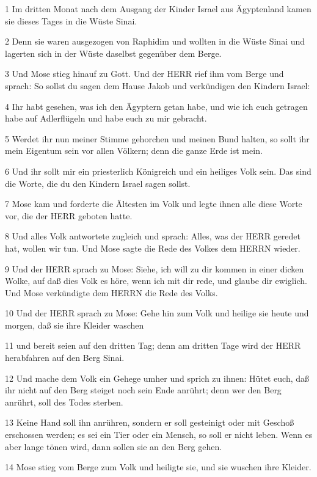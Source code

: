 \par 1 Im dritten Monat nach dem Ausgang der Kinder Israel aus Ägyptenland kamen sie dieses Tages in die Wüste Sinai.
\par 2 Denn sie waren ausgezogen von Raphidim und wollten in die Wüste Sinai und lagerten sich in der Wüste daselbst gegenüber dem Berge.
\par 3 Und Mose stieg hinauf zu Gott. Und der HERR rief ihm vom Berge und sprach: So sollst du sagen dem Hause Jakob und verkündigen den Kindern Israel:
\par 4 Ihr habt gesehen, was ich den Ägyptern getan habe, und wie ich euch getragen habe auf Adlerflügeln und habe euch zu mir gebracht.
\par 5 Werdet ihr nun meiner Stimme gehorchen und meinen Bund halten, so sollt ihr mein Eigentum sein vor allen Völkern; denn die ganze Erde ist mein.
\par 6 Und ihr sollt mir ein priesterlich Königreich und ein heiliges Volk sein. Das sind die Worte, die du den Kindern Israel sagen sollst.
\par 7 Mose kam und forderte die Ältesten im Volk und legte ihnen alle diese Worte vor, die der HERR geboten hatte.
\par 8 Und alles Volk antwortete zugleich und sprach: Alles, was der HERR geredet hat, wollen wir tun. Und Mose sagte die Rede des Volkes dem HERRN wieder.
\par 9 Und der HERR sprach zu Mose: Siehe, ich will zu dir kommen in einer dicken Wolke, auf daß dies Volk es höre, wenn ich mit dir rede, und glaube dir ewiglich. Und Mose verkündigte dem HERRN die Rede des Volks.
\par 10 Und der HERR sprach zu Mose: Gehe hin zum Volk und heilige sie heute und morgen, daß sie ihre Kleider waschen
\par 11 und bereit seien auf den dritten Tag; denn am dritten Tage wird der HERR herabfahren auf den Berg Sinai.
\par 12 Und mache dem Volk ein Gehege umher und sprich zu ihnen: Hütet euch, daß ihr nicht auf den Berg steiget noch sein Ende anrührt; denn wer den Berg anrührt, soll des Todes sterben.
\par 13 Keine Hand soll ihn anrühren, sondern er soll gesteinigt oder mit Geschoß erschossen werden; es sei ein Tier oder ein Mensch, so soll er nicht leben. Wenn es aber lange tönen wird, dann sollen sie an den Berg gehen.
\par 14 Mose stieg vom Berge zum Volk und heiligte sie, und sie wuschen ihre Kleider.
